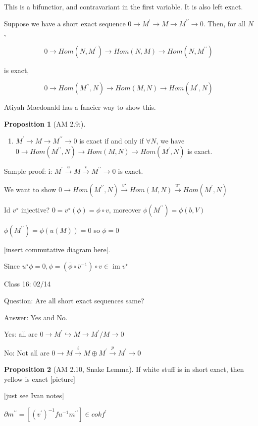 \documentclass{article}
\theoremstyle{definition}
\newtheorem{proposition}{Proposition}
\newcommand{\im}{\operatorname{im}}
\begin{document}
This is a bifunctior, and contravariant in the first variable. It is also left exact.

Suppose we have a short exact sequence \(0 \to M^{\prime}  \to M \to M^{\prime\prime} \to 0\). Then, for all \(N\),

\[
    0 \to Hom(N,M^{\prime}) \to Hom(N,M) \to Hom(N,M^{\prime\prime})
\]

is exact,

\[
    0 \to  Hom(M^{\prime\prime},N) \to Hom(M,N) \to Hom(M^{\prime} , N)
\]

Atiyah Macdonald has a fancier way to show this.

\begin{proposition}
    [AM 2.9:]

    \begin{enumerate}
        \item \(M^{\prime}  \to  M \to M^{\prime\prime} \to 0\) is exact if and only if \(\forall N\), we have \(0 \to Hom(M^{\prime\prime},N)\to Hom(M,N) \to Hom (M^{\prime} ,N)\) is exact.
    \end{enumerate}
\end{proposition}

Sample proof: i: \(M^{\prime} \overset{u}{\to} M \overset{v}{\to} M^{\prime\prime} \to 0\) is exact.

We want to show \(0 \to Hom (M^{\prime\prime}, N)\overset{v^{\star}}{\to}Hom(M,N)\overset{u^{\star}}{\to} Hom(M^{\prime} , N) \) 

Id \(v^{\star}\) injective? \(0 = v^{\star}(\phi) = \phi\circ v\), moreover \(\phi(M^{\prime\prime} )=\phi(b,V)\)  

\(\phi(M^{\prime\prime})=\phi(u(M))=0 \) so \(\phi= 0\) 

[insert commutative diagram here].

Since \(u^{\star} \phi = 0, \phi = (\overline{\phi} \circ \overline{v} ^{-1} )\circ v \in \im v^{\star}\) 

\hrulefill

Class 16: 02/14

Question: Are all short exact sequences same?

Answer: Yes and No.

Yes: all are \(0 \to M^{\prime} \hookrightarrow M \to M^{\prime} / M \to 0\) 

No: Not all are \(0 \to M \overset{i}{\to} M \oplus M^{\prime} \overset{p}{\to} M^{\prime} \to 0\) 

\begin{proposition}
    [AM 2.10, Snake Lemma]

    If white stuff is in short exact, then yellow is exact [picture]

    [just see Ivan notes]

    \(\partial m^{\prime\prime} = \left[ (v^{\prime} )^{-1} f u ^{-1} m ^{\prime\prime}  \right] \in cok f^{\prime} \) 

\end{proposition}
\end{document}
